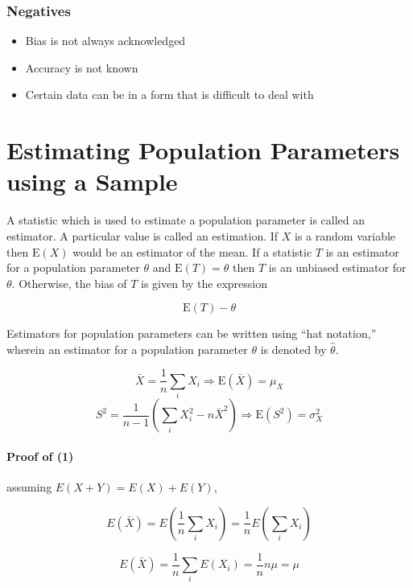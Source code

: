\documentclass{article}
\begin{document}
\subsubsection{Negatives}

\begin{itemize}

    \item Bias is not always acknowledged 
    \item Accuracy is not known 
    \item Certain data can be in a form that is difficult to deal with

\end{itemize}

\section{Estimating Population Parameters using a Sample}

A statistic which is used to estimate a population parameter is called an
estimator. A particular value is called an estimation. If $X$ is a random
variable then $\textrm{E}(X)$ would be an estimator of the mean. If a statistic
$T$ is an estimator for a population parameter $\theta$ and
$\textrm{E}(T)=\theta$ then $T$ is an unbiased estimator for $\theta$.
Otherwise, the bias of $T$ is given by the expression

\[\textrm{E}(T)-\theta\]

\noindent Estimators for population parameters can be written using ``hat
notation,'' wherein an estimator for a population parameter $\theta$ is denoted
by $\hat{\theta}$.

\begin{equation}\bar{X}=\frac{1}{n}\sum_iX_i\Rightarrow
\textrm{E}(\bar{X})=\mu_X\end{equation}
\begin{equation}S^2=\frac{1}{n-1}\left(\sum_iX_i^2-n\bar{X}^2\right)\Rightarrow
\textrm{E}(S^2)=\sigma_X^2\end{equation}

\paragraph{Proof of (1)} assuming $E(X+Y)=E(X)+E(Y)$,

\[E(\bar{X})=E\left(\frac{1}{n}\sum_iX_i\right)=\frac{1}{n}E\left(\sum_iX_i\right)\]

\[E(\bar{X})=\frac{1}{n}\sum_iE(X_i)=\frac{1}{n}n\mu=\mu\]
\end{document}
